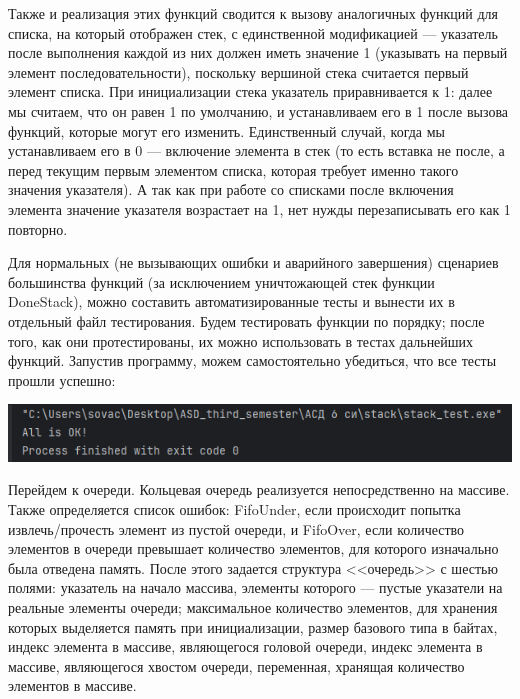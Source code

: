 \documentclass[12pt]{article}
\begin{document}
{	 
	
	Также и реализация этих функций сводится к вызову аналогичных функций для списка, на который отображен стек, с единственной модификацией --- указатель после выполнения каждой из них должен иметь значение 1 (указывать на первый элемент последовательности), поскольку вершиной стека считается первый элемент списка. При инициализации стека указатель приравнивается к 1: далее мы считаем, что он равен 1 по умолчанию, и устанавливаем его в 1 после вызова функций, которые могут его изменить. Единственный случай, когда мы устанавливаем его в 0 --- включение элемента в стек (то есть вставка не после, а перед текущим первым элементом списка, которая требует именно такого значения указателя). А так как при работе со списками после включения элемента значение указателя возрастает на 1, нет нужды перезаписывать его как 1 повторно.
	
	 
	
	Для нормальных (не вызывающих ошибки и аварийного завершения) сценариев большинства функций (за исключением уничтожающей стек функции DoneStack), можно составить автоматизированные тесты и вынести их в отдельный файл тестирования. Будем тестировать функции по порядку; после того, как они протестированы, их можно использовать в тестах дальнейших функций. Запустив программу, можем самостоятельно убедиться, что все тесты прошли успешно:
	
	 
	
	\includegraphics[width=150mm]{images/stack_test.png}
	
	Перейдем к очереди. Кольцевая очередь реализуется непосредственно на массиве. Также определяется список ошибок: FifoUnder, если происходит попытка извлечь/прочесть элемент из пустой очереди, и FifoOver, если количество элементов в очереди превышает количество элементов, для которого изначально была отведена память. После этого задается структура <<очередь>> с шестью полями: указатель на начало массива, элементы которого --- пустые указатели на реальные элементы очереди; максимальное количество элементов, для хранения которых выделяется память при инициализации, размер базового типа в байтах, индекс элемента в массиве, являющегося головой очереди, индекс элемента в массиве, являющегося хвостом очереди, переменная, хранящая количество элементов в массиве.
	
}
\end{document}
